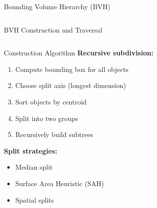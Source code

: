 \begin{frame}{Bounding Volume Hierarchy (BVH)}
\begin{columns}
\begin{column}{0.5\textwidth}
        \end{column}
    \end{columns}
\end{frame}

\begin{frame}{BVH Construction and Traversal}
    \begin{columns}
        \begin{column}{0.5\textwidth}
            \begin{mathbox}{Construction Algorithm}
                \textbf{Recursive subdivision:}
                \begin{enumerate}
                    \item Compute bounding box for all objects
                    \item Choose split axis (longest dimension)
                    \item Sort objects by centroid
                    \item Split into two groups
                    \item Recursively build subtrees
                \end{enumerate}

                \vspace{0.3cm}
                \textbf{Split strategies:}
                \begin{itemize}
                    \item Median split
                    \item Surface Area Heuristic (SAH)
                    \item Spatial splits
                \end{itemize}
            \end{mathbox}
        \end{column}
        \begin{column}{0.5\textwidth}
\end{column}
\end{columns}
\end{frame}
